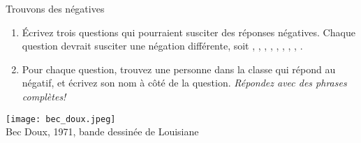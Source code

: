 \begin{frame}{Trouvons des négatives}
  \begin{enumerate}
    \item Écrivez trois questions qui pourraient susciter  des réponses négatives. Chaque question devrait susciter une négation différente, soit , , , , , , , , .
    \item<2-> Pour chaque question, trouvez une personne dans la classe qui répond au négatif, et écrivez son nom à côté de la question. \emph{Répondez avec des phrases complètes!}
  \end{enumerate}
  \begin{center}
    \footnotesize
    \texttt{[image: bec\_doux.jpeg]} \\
    Bec Doux, 1971, bande dessinée de Louisiane
  \end{center}
\end{frame}